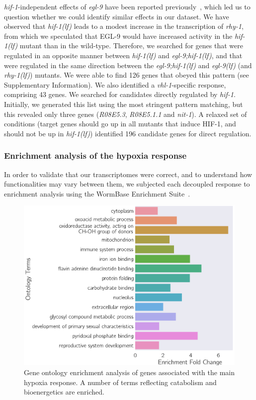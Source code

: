 \documentclass[9pt,twocolumn,twoside]{pnas-new}
\newcommand{\gene}[1]{\emph{#1}}
\newcommand{\egl}{\emph{egl-9(lf)}}
\newcommand{\rhy}{\emph{rhy-1(lf)}}
\newcommand{\eglhif}{\emph{egl-9;hif-1(lf)}}
\newcommand{\hif}{\emph{hif-1(lf)}}
\newcommand{\eglp}{EGL-9}
\newcommand{\hifp}{HIF-1}
\newcommand{\egltargets}{126}
\newcommand{\vhltargets}{43} %
\newcommand{\hiftargets}{196}
\begin{document}
\gene{hif-1}-independent effects of \gene{egl-9} have been reported
previously~\cite{Park2012}, which led us to question whether we could identify
similar effects in our dataset. We have observed that \hif{} leads to a modest
increase in the transcription of \gene{rhy-1}, from which we speculated that
\eglp{} would have increased activity in the \hif{} mutant than in the wild-type.
Therefore, we searched for genes that were regulated in an opposite manner between
\hif{} and \eglhif{}, and that were regulated in the same direction between the
\eglhif{} and \egl{} (and \rhy{}) mutants. We were able to find \egltargets{}
genes that obeyed this pattern (see Supplementary Information). We also identified
a \gene{vhl-1}-specific response, comprising \vhltargets{} genes. We searched
for candidates directly regulated by \gene{hif-1}. Initially, we generated this
list using the most stringent pattern matching, but this revealed only three genes
(\emph{R08E5.3}, \emph{R08E5.1.1} and \emph{nit-1}). A relaxed set of conditions
(target genes should go up in all mutants that induce \hifp{}, and should not be
up in \hif{}) identified \hiftargets{} candidate genes for direct regulation.

\subsubsection*{Enrichment analysis of the hypoxia response}
\label{sub:ea_hypoxia}
In order to validate that our transcriptomes were correct, and to understand how
functionalities may vary between them, we subjected each decoupled response to
enrichment analysis using the WormBase Enrichment Suite~\cite{Angeles-Albores2016,
Angeles-Albores2016b}.

\begin{figure}[tbhp]
\centering
\includegraphics[width=\linewidth]{figs/hypoxia_response_gea.pdf}
\caption{
Gene ontology enrichment analysis of genes associated with the main hypoxia response.
A number of terms reflecting catabolism and bioenergetics are enriched.
}
\label{fig:hyp_gea}
\end{figure}
\end{document}
